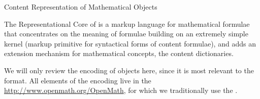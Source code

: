 \begin{omgroup}[id=mobj.core]{Content Representation of Mathematical Objects}
\begin{module}[id=OpenMath]
\begin{omgroup}[id=openmath]{The Representational Core of \openmath}
\openmath is a markup language for mathematical formulae that concentrates on the
meaning of formulae building on an extremely simple kernel (markup primitive for
syntactical forms of content formulae), and adds an extension mechanism for mathematical
concepts, the content dictionaries.


We will only review the \xml encoding of {\openmath} objects here, since it is most
relevant to the \omdoc format. All elements of the {\xml} encoding live in the
 \url{http://www.openmath.org/OpenMath}, for which
we traditionally use the 
.


\end{omgroup}
\end{module}
\end{omgroup}
